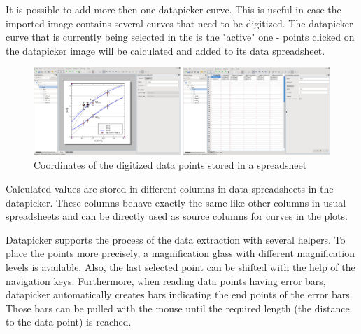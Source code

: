 It is possible to add more then one datapicker curve. This is useful in case the imported image contains several curves that need to be digitized.
The datapicker curve that is currently being selected in the  is the "active" one - points clicked on the datapicker image will be calculated and added to its data spreadsheet.
\begin{figure}
\includegraphics[width=\textwidth]{images/datapicker_active_curve_data_spreadsheet.png}
\caption{Coordinates of the digitized data points stored in a spreadsheet}
\end{figure}

Calculated values are stored in different columns in data spreadsheets in the datapicker. These columns behave exactly the same like other columns
in usual spreadsheets and can be directly used as source columns for curves in the plots.

Datapicker supports the process of the data extraction with several helpers. To place the points more precisely, a magnification glass with different magnification levels is available.
Also, the last selected point can be shifted with the help of the navigation keys.
Furthermore, when reading data points having error bars, datapicker automatically creates bars indicating the end points of the error bars.
Those bars can be pulled with the mouse until the required length (the distance to the data point) is reached.

